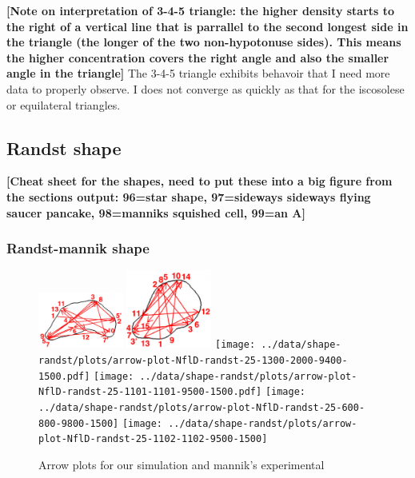\documentclass[letterpaper,twocolumn,amsmath,amssymb,pre]{revtex4-1}
\newcommand{\red}[1]{{\bf \color{red} #1}}
\newcommand{\fixme}[1]{\red{[#1]}}
\begin{document}
\fixme{Note on interpretation of 3-4-5 triangle: the higher density
  starts to the right of a vertical line that is parrallel to the
  second longest side in the triangle (the longer of the two
  non-hypotonuse sides).  This means the higher concentration covers
  the right angle and also the smaller angle in the triangle} The
3-4-5 triangle exhibits behavoir that I need more data to properly
observe.  I does not converge as quickly as that for the iscosolese or
equilateral triangles.

\subsection{Randst shape}
\fixme{Cheat sheet for the shapes, need to put these into a big figure
  from the sections output: 96=star shape, 97=sideways sideways
  flying saucer pancake, 98=manniks squished cell, 99=an A}

\subsubsection{Randst-mannik shape}
\begin{figure}
  \includegraphics[width=2.8cm]{../mannik-2.png}
  \includegraphics[width=2.8cm]{../mannik-1.png}
  \texttt{[image: ../data/shape-randst/plots/arrow-plot-NflD-randst-25-1300-2000-9400-1500.pdf]}
  \texttt{[image: ../data/shape-randst/plots/arrow-plot-NflD-randst-25-1101-1101-9500-1500.pdf]}
  \texttt{[image: ../data/shape-randst/plots/arrow-plot-NflD-randst-25-600-800-9800-1500]}
  \texttt{[image: ../data/shape-randst/plots/arrow-plot-NflD-randst-25-1102-1102-9500-1500]}
  \caption{Arrow plots for our simulation and mannik's experimental}
  \label{arrow-compare-mannik}
\end{figure}
\end{document}
